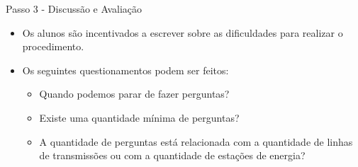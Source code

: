 \documentclass{beamer}
\begin{document}
\begin{frame}{Passo 3 - Discussão e Avaliação}

\begin{itemize}

\item<1-> Os alunos são incentivados a escrever sobre as dificuldades para realizar o procedimento.

\item<2-> Os seguintes questionamentos podem ser feitos:

\begin{itemize}
    \item Quando podemos parar de fazer perguntas?
    \item Existe uma quantidade mínima de perguntas?
    \item A quantidade de perguntas está relacionada com a quantidade de linhas de transmissões ou com a quantidade de estações de energia?
\end{itemize}


\end{itemize}


\end{frame}
\end{document}
